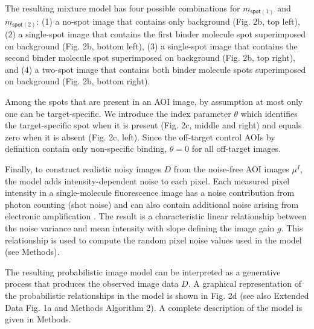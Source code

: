 The resulting mixture model has four possible combinations for $m_{\mathsf{spot}(1)}$ and $m_{\mathsf{spot}(2)}$: (1) a no-spot image that contains only background (Fig. 2b, top left), (2) a single-spot image that contains the first binder molecule spot superimposed on background (Fig. 2b, bottom left), (3) a single-spot image that contains the second binder molecule spot superimposed on background (Fig. 2b, top right), and (4) a two-spot image that contains both binder molecule spots superimposed on background (Fig. 2b, bottom right).

Among the spots that are present in an AOI image, by assumption at most only one can be target-specific. We introduce the index parameter $\theta$ which identifies the target-specific spot  when it is present (Fig. 2c, middle and right) and equals zero when it is absent (Fig. 2c, left). Since the off-target control AOIs by definition contain only non-specific binding, $\theta = 0$ for all off-target images. 

Finally, to construct realistic noisy images $D$ from the noise-free AOI images $\mu^I$, the model adds intensity-dependent noise to each pixel.  Each measured pixel intensity in a single-molecule fluorescence image has a noise contribution from photon counting (shot noise) and can also contain additional noise arising from electronic amplification \cite{Van_Vliet1998-jk}. The result is a characteristic linear relationship between the noise variance and mean intensity with slope defining the image gain $g$. This relationship is used to compute the random pixel noise values used in the model (see Methods).

The resulting probabilistic image model can be interpreted as a generative process that produces the observed image data $D$. A graphical representation of the probabilistic relationships in the model is shown in Fig. 2d (see also Extended Data Fig. 1a and Methods Algorithm 2). A complete description of the model is given in Methods.  

